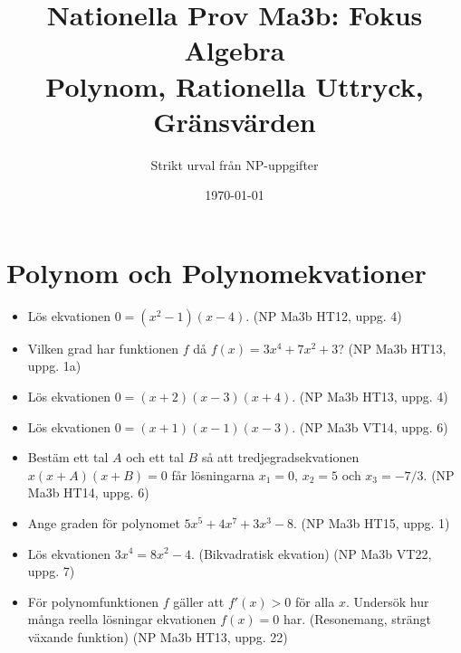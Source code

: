 \documentclass{article}
\title{Nationella Prov Ma3b: Fokus Algebra \\ \large Polynom, Rationella Uttryck, Gränsvärden}
\author{Strikt urval från NP-uppgifter}
\date{\today}
\begin{document}
\maketitle

\section{Polynom och Polynomekvationer}
\begin{itemize}
    \item Lös ekvationen $0 = (x^2-1)(x-4)$. (NP Ma3b HT12, uppg. 4)
    \item Vilken grad har funktionen $f$ då $f(x) = 3x^4 + 7x^2 + 3$? (NP Ma3b HT13, uppg. 1a)
    \item Lös ekvationen $0 = (x+2)(x-3)(x+4)$. (NP Ma3b HT13, uppg. 4)
    \item Lös ekvationen $0 = (x+1)(x-1)(x-3)$. (NP Ma3b VT14, uppg. 6)
    \item Bestäm ett tal $A$ och ett tal $B$ så att tredjegradsekvationen $x(x+A)(x+B)=0$ får lösningarna $x_1=0$, $x_2=5$ och $x_3 = -7/3$. (NP Ma3b HT14, uppg. 6)
    \item Ange graden för polynomet $5x^5 + 4x^7 + 3x^3 - 8$. (NP Ma3b HT15, uppg. 1)
    \item Lös ekvationen $3x^4 = 8x^2 - 4$. (Bikvadratisk ekvation) (NP Ma3b VT22, uppg. 7)
    \item För polynomfunktionen $f$ gäller att $f'(x) > 0$ för alla $x$. Undersök hur många reella lösningar ekvationen $f(x) = 0$ har. (Resonemang, strängt växande funktion) (NP Ma3b HT13, uppg. 22)
\end{itemize}
\end{document}
